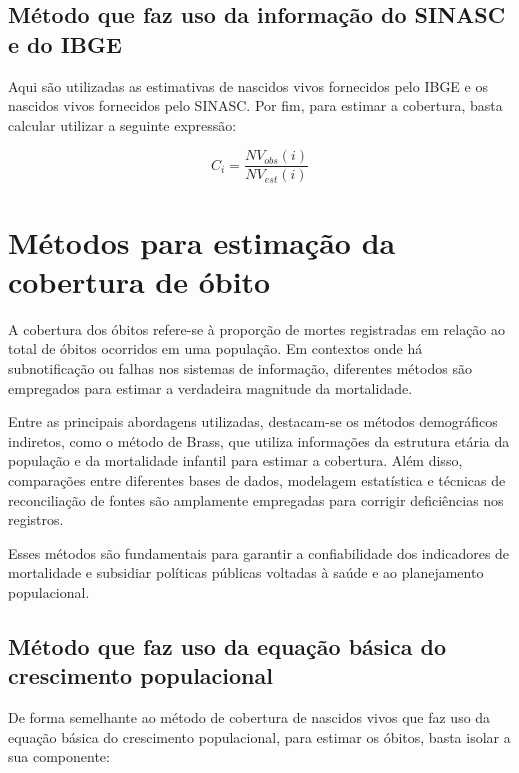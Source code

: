 \documentclass[
  12pt,
  a4paper,
]{scrreprt}
\begin{document}
\subsection{Método que faz uso da informação do SINASC e do
IBGE}\label{muxe9todo-que-faz-uso-da-informauxe7uxe3o-do-sinasc-e-do-ibge}

Aqui são utilizadas as estimativas de nascidos vivos fornecidos pelo
IBGE e os nascidos vivos fornecidos pelo SINASC. Por fim, para estimar a
cobertura, basta calcular utilizar a seguinte expressão:

\[
C_i = \frac{NV_{obs}\left(i\right)}{NV_{est}\left(i\right)}
\]

\section{Métodos para estimação da cobertura de
óbito}\label{muxe9todos-para-estimauxe7uxe3o-da-cobertura-de-uxf3bito}

A cobertura dos óbitos refere-se à proporção de mortes registradas em
relação ao total de óbitos ocorridos em uma população. Em contextos onde
há subnotificação ou falhas nos sistemas de informação, diferentes
métodos são empregados para estimar a verdadeira magnitude da
mortalidade.

\vspace{12pt}

Entre as principais abordagens utilizadas, destacam-se os métodos
demográficos indiretos, como o método de Brass, que utiliza informações
da estrutura etária da população e da mortalidade infantil para estimar
a cobertura. Além disso, comparações entre diferentes bases de dados,
modelagem estatística e técnicas de reconciliação de fontes são
amplamente empregadas para corrigir deficiências nos registros.

\vspace{12pt}

Esses métodos são fundamentais para garantir a confiabilidade dos
indicadores de mortalidade e subsidiar políticas públicas voltadas à
saúde e ao planejamento populacional.

\subsection{Método que faz uso da equação básica do crescimento
populacional}\label{muxe9todo-que-faz-uso-da-equauxe7uxe3o-buxe1sica-do-crescimento-populacional}

De forma semelhante ao método de cobertura de nascidos vivos que faz uso
da equação básica do crescimento populacional, para estimar os óbitos,
basta isolar a sua componente:
\end{document}

